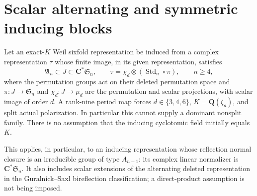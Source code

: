 \section{Scalar alternating and symmetric inducing blocks}
\begin{theorem}
\label{D-BI-08}
Let an exact-$K$ Weil sixfold representation be induced from a
complex representation $\tau$ whose finite image, in its given
representation, satisfies
\[
 \mathfrak A_n\subset J\subset\mathbf C^*\mathfrak S_n,
 \qquad \tau=\chi_d\otimes(\operatorname{Std}_n\circ\pi),
 \qquad n\ge4,
\tag{BI.12}
\]
where the permutation groups act on their deleted permutation space
and $\pi:J\to\mathfrak S_n$ and $\chi_d:J\to\mu_d$ are the
permutation and scalar projections, with scalar image of order $d$.
A rank-nine period
map forces $d\in\{3,4,6\}$, $K=\mathbf Q(\zeta_d)$, and split
actual polarization.  In particular this cannot supply a dominant
nonsplit family.  There is no assumption that the inducing
cyclotomic field initially equals $K$.

This applies, in particular, to an inducing representation whose
reflection normal closure is an irreducible group of type $A_{n-1}$:
its complex linear normalizer is $\mathbf C^*\mathfrak S_n$.
It also includes scalar extensions of the alternating deleted
representation in the Guralnick--Saxl bireflection classification;
a direct-product assumption is not being imposed.
\end{theorem}
